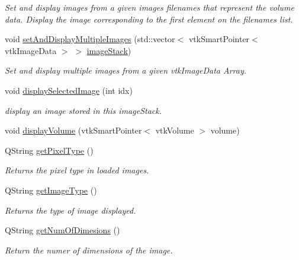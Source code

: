 \begin{DoxyCompactItemize}
\begin{DoxyCompactList}\small\item\em Set and display images from a given images filenames that represent the volume data. Display the image corresponding to the first element on the filenames list. \end{DoxyCompactList}\item 
void \hyperlink{class_q_v_t_k_image_widget_ae2b3f8c58a1c1162ce506b6da4a49e4c}{set\-And\-Display\-Multiple\-Images} (std\-::vector$<$ vtk\-Smart\-Pointer$<$ vtk\-Image\-Data $>$ $>$ \hyperlink{class_q_v_t_k_image_widget_a336708e27578dab885b069f12c120138}{image\-Stack})
\begin{DoxyCompactList}\small\item\em Set and display multiple images from a given vtk\-Image\-Data Array. \end{DoxyCompactList}\item 
void \hyperlink{class_q_v_t_k_image_widget_a74232311be68637533974b68b4d63bc5}{display\-Selected\-Image} (int idx)
\begin{DoxyCompactList}\small\item\em display an image stored in this image\-Stack. \end{DoxyCompactList}\item 
void \hyperlink{class_q_v_t_k_image_widget_af5a9192eb09b6db8582160aa527fc685}{display\-Volume} (vtk\-Smart\-Pointer$<$ vtk\-Volume $>$ volume)
\item 
Q\-String \hyperlink{class_q_v_t_k_image_widget_acb6c70c4b6e1394b0054d0902e72fcbf}{get\-Pixel\-Type} ()
\begin{DoxyCompactList}\small\item\em Returns the pixel type in loaded images. \end{DoxyCompactList}\item 
Q\-String \hyperlink{class_q_v_t_k_image_widget_af0626a3fda57807caecbbe115e95d409}{get\-Image\-Type} ()
\begin{DoxyCompactList}\small\item\em Returns the type of image displayed. \end{DoxyCompactList}\item 
Q\-String \hyperlink{class_q_v_t_k_image_widget_ac1b3215b0360177a7dfaad8461f42790}{get\-Num\-Of\-Dimesions} ()
\begin{DoxyCompactList}\small\item\em Return the numer of dimensions of the image. \end{DoxyCompactList}\item 

\end{DoxyCompactItemize}
